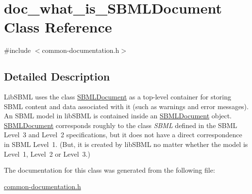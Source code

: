 \hypertarget{classdoc__what__is___s_b_m_l_document}{}\section{doc\+\_\+what\+\_\+is\+\_\+\+S\+B\+M\+L\+Document Class Reference}
\label{classdoc__what__is___s_b_m_l_document}


{\ttfamily \#include $<$common-\/documentation.\+h$>$}



\subsection{Detailed Description}
\begin{DoxyParagraph}{}
Lib\+S\+B\+ML uses the class \hyperlink{class_s_b_m_l_document}{S\+B\+M\+L\+Document} as a top-\/level container for storing S\+B\+ML content and data associated with it (such as warnings and error messages). An S\+B\+ML model in lib\+S\+B\+ML is contained inside an \hyperlink{class_s_b_m_l_document}{S\+B\+M\+L\+Document} object. \hyperlink{class_s_b_m_l_document}{S\+B\+M\+L\+Document} corresponds roughly to the class {\itshape S\+B\+ML} defined in the S\+B\+ML Level~3 and Level~2 specifications, but it does not have a direct correspondence in S\+B\+ML Level~1. (But, it is created by lib\+S\+B\+ML no matter whether the model is Level~1, Level~2 or Level~3.) 
\end{DoxyParagraph}


The documentation for this class was generated from the following file\+:\begin{DoxyCompactItemize}
\item 
\hyperlink{common-documentation_8h}{common-\/documentation.\+h}\end{DoxyCompactItemize}
